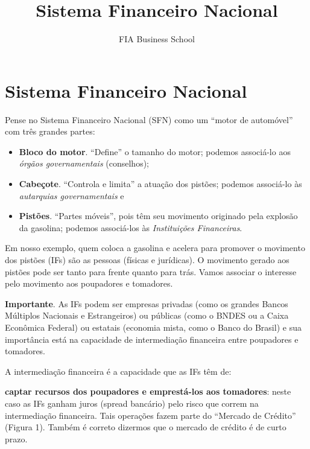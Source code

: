 \documentclass{article}\usepackage[]{graphicx}\usepackage[]{xcolor}
\title{Sistema Financeiro Nacional}
\author{FIA Business School}
\begin{document}
\maketitle

\section*{Sistema Financeiro Nacional}

Pense no Sistema Financeiro Nacional (SFN) como um \enquote{motor de automóvel} com três grandes partes:

\begin{itemize}

  \item \textbf{Bloco do motor}. \enquote{Define} o tamanho do motor; podemos associá-lo aos \textit{órgãos governamentais} (conselhos);

  \item \textbf{Cabeçote}. \enquote{Controla e limita}  a atuação dos pistões; podemos associá-lo às \textit{autarquias governamentais} e

  \item \textbf{Pistões}. \enquote{Partes móveis}, pois têm seu movimento originado pela explosão da gasolina; 
        podemos associá-los às \textit{Instituições Financeiras}.

\end{itemize}

Em nosso exemplo, quem coloca a gasolina e acelera para promover o movimento dos pistões (IFs) são as pessoas 
(físicas e jurídicas). O movimento gerado aos pistões pode ser tanto para frente quanto para trás. 
Vamos associar o interesse pelo movimento aos poupadores e tomadores.\par

\textbf{Importante}. As IFs podem ser empresas privadas (como os grandes Bancos Múltiplos Nacionais e Estrangeiros) 
ou públicas (como o BNDES ou a Caixa Econômica Federal) ou estatais (economia mista, como o Banco do Brasil) e sua 
importância está na capacidade de intermediação financeira entre poupadores e tomadores.\par

A intermediação financeira é a capacidade que as IFs têm de:

\textbf{captar recursos dos poupadores e emprestá-los aos tomadores}: neste caso as IFs ganham juros 
(spread bancário) pelo risco que correm na intermediação financeira. Tais operações fazem parte do 
\enquote{Mercado de Crédito} (Figura 1). Também é correto dizermos que o mercado de crédito é de curto prazo.
\end{document}

